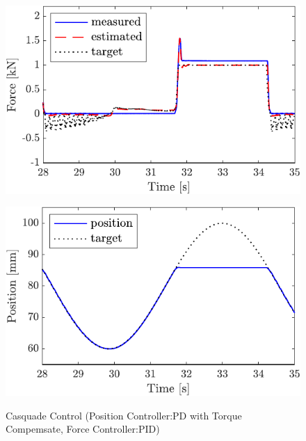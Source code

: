 \begin{figure}[t]
    \begin{minipage}{\minipageratio\hsize}
    \centering
        \includegraphics[keepaspectratio, scale = \minifigscale]{contents/IntegrationControl/figure/SECASQ/crop-FBcsqtch_PID_trq_force.pdf}
        \label{fig5:crop-FBcsqtch_PID_trq_force}
    \end{minipage}
    \begin{minipage}{\minipageratio\hsize}
    \centering
        \includegraphics[keepaspectratio, scale = \minifigscale]{contents/IntegrationControl/figure/SECASQ/crop-FBcsqtch_PID_trq_pos.pdf}
        \label{fig5:crop-FBcsqtch_PID_trq_pos}
    \end{minipage}
    \caption{Casquade Control (Position Controller:PD with Torque Compemsate, Force Controller:PID)}  
    \label{fig5:crop-FBcsqtch_PID_trq}
\end{figure}

